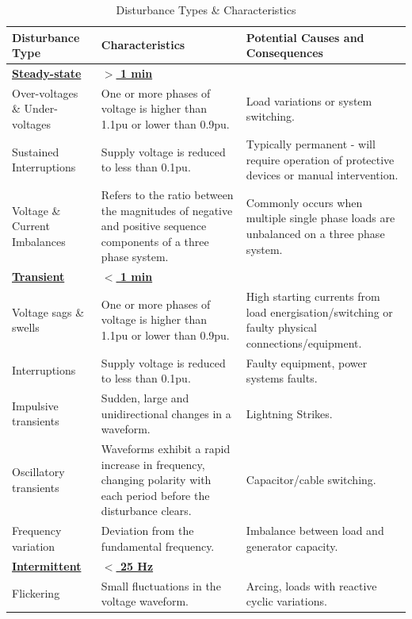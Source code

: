 \documentclass[12pt]{article}
\begin{document}
{\renewcommand{\arraystretch}{1.2}	
\begin{table}[h!]
\centering
\noindent
\begin{tabular}{|>{\RaggedRight}p{}|p{}|p{}|}
\hline
Disturbance Type & Characteristics & Potential Causes and Consequences \\
\hline
\textbf{\underline{Steady-state}}  &  \textbf{\underline{$>$ 1 min}} & \\
\hline
Over-voltages \& Under-voltages &  One or more phases of voltage is higher than 1.1pu or lower than 0.9pu.& Load variations or system switching.\\
Sustained Interruptions & Supply voltage is reduced to less than 0.1pu. & Typically permanent - will require operation of protective devices or manual intervention.\\
Voltage \& Current Imbalances & Refers to the ratio between the magnitudes of negative and positive sequence components of a three phase system. & Commonly occurs when multiple single phase loads are unbalanced on a three phase system.\\
\hline
\textbf{\underline{Transient}}  &  \textbf{\underline{$<$ 1 min}} & \\
\hline
Voltage sags \& swells & One or more phases of voltage is higher than 1.1pu or lower than 0.9pu.& High starting currents from load energisation/switching or faulty physical connections/equipment.\\
Interruptions & Supply voltage is reduced to less than 0.1pu.& Faulty equipment, power systems faults.\\
Impulsive transients & Sudden, large and unidirectional changes in a waveform. & Lightning Strikes.\\
Oscillatory transients & Waveforms exhibit a rapid increase in frequency, changing polarity with each period before the disturbance clears. & Capacitor/cable switching.\\
Frequency variation & Deviation from the fundamental frequency. & Imbalance between load and generator capacity.\\
\hline
\textbf{\underline{Intermittent}}  & \textbf{\underline{$<$ 25 Hz}} & \\
\hline 
Flickering & Small fluctuations in the voltage waveform.& Arcing, loads with reactive cyclic variations.\\
\hline
\end{tabular}
\caption{Disturbance Types \& Characteristics}
\end{table}


}
\end{document}
